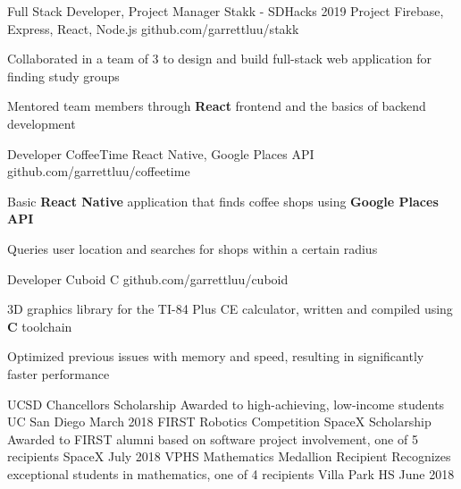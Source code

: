 \documentclass[]{awesome-cv}
\begin{document}
\vspace{-5mm}
\begin{cventries}

	\cventry
  {Full Stack Developer, Project Manager}
  {Stakk - SDHacks 2019 Project}
	{Firebase, Express, React, Node.js}
	{github.com/garrettluu/stakk}
  {\begin{cvitems}
    \item{Collaborated in a team of 3 to design and build full-stack web
      application for finding study groups}
    \item{Mentored team members through \textbf{React} frontend and the basics
      of backend development}
    \end{cvitems}}

  \vspace{-3mm}
	\cventry
  {Developer}
  {CoffeeTime}
  {React Native, Google Places API}
	{github.com/garrettluu/coffeetime}
  {\begin{cvitems}
    \item{Basic \textbf{React Native} application that finds coffee shops using
      \textbf{Google Places API}}
    \item{Queries user location and searches for shops within a certain radius}
    \end{cvitems}}

  \vspace{-3mm}
	\cventry
  {Developer}
	{Cuboid}
	{C}
	{github.com/garrettluu/cuboid}
  {\begin{cvitems}
	  \item{3D graphics library for the TI-84 Plus CE calculator, written and
      compiled using \textbf{C} toolchain}
    \item{Optimized previous issues with memory and speed, resulting in
      significantly faster performance}
    \end{cvitems}}

\end{cventries}

\vspace{-5mm}
\begin{cvhonors}
	\cvhonor
	{UCSD Chancellor\textquotesingle{}s Scholarship}
	{Awarded to high-achieving, low-income students}
	{UC San Diego}
	{March 2018}
	\cvhonor
	{FIRST Robotics Competition SpaceX Scholarship}
	{Awarded to FIRST alumni based on software project involvement, one of 5
    recipients}
	{SpaceX}
	{July 2018}
	\cvhonor
	{VPHS Mathematics Medallion Recipient}
	{Recognizes exceptional students in mathematics, one of 4 recipients}
	{Villa Park HS}
	{June 2018}
\end{cvhonors}
\end{document}
